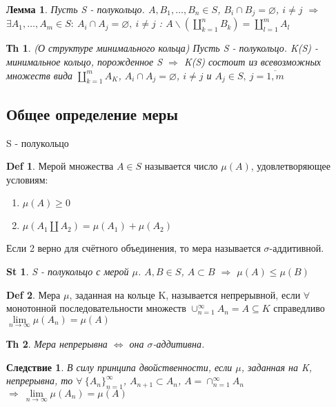 \documentclass[14pt]{article}
\theoremstyle{plain}
\newtheorem{Thm}{Тh}
\newtheorem{Lem}{Лемма}
\newtheorem{St}{St}
\newtheorem{Sled}{Следствие}
\theoremstyle{definition}
\newtheorem{Def}{Def}
\begin{document}
			\begin{Lem}
				Пусть S - полукольцо. $A, B_1, \dots, B_n \in S $, $B_i \cap B_j = \varnothing$, $i \neq j$ $\Rightarrow$ $\exists A_1, \dots, A_m \in S: \ A_i \cap A_j = \varnothing, \ i \neq j$ : $A \backslash \left( \coprod\limits_{k=1}^{n} B_k \right) = \coprod\limits_{l=1}^{m} A_l$
			\end{Lem}
			\begin{Thm}
				(О структуре минимального кольца)\newline 
				Пусть S - полукольцо. K(S) - минимальное кольцо, порожденное S $\Rightarrow$ K(S) состоит из всевозможных множеств вида $\coprod\limits_{k=1}^{m} A_K$, $A_i \cap A_j = \varnothing$, $i \neq j$ и $A_j \in S, \ j = \overline{1, m}$
			\end{Thm}
		\subsection{Общее определение меры}
		 S - полукольцо
		 \begin{Def}
			Мерой множества $A \in S$ называется число $\mu(A)$, удовлетворяющее условиям:
			\begin{enumerate}
				\item $\mu(A) \geq 0$
				\item $\mu\left( A_1 \coprod A_2 \right) = \mu(A_1) + \mu(A_2)$
			\end{enumerate}
			Если 2 верно для счётного объединения, то мера называется $\sigma$-аддитивной. 
		 \end{Def}
		 \begin{St}
			S - полукольцо с мерой $\mu$. $A, B \in S$, $A \subset B$ $\Rightarrow$ $\mu(A) \leq \mu(B)$
		 \end{St}
		 \begin{Def}
			 Мера $\mu$, заданная на кольце K, называется непрерывной, если $\forall$ монотонной последовательности множеств $\cup_{n=1}^{\infty} A_n = A \subseteq K$ справедливо $\lim\limits_{n\to \infty} \mu(A_n) = \mu(A)$
	     \end{Def}
		 \begin{Thm}
			Мера непрерывна $\Leftrightarrow$ она $\sigma$-аддитивна.
		\end{Thm}
		\begin{Sled}
			В силу принципа двойственности, если $\mu$, заданная на K, непрерывна, то $\forall \ \{A_n  \}_{n =1}^{\infty}$, $A_{n+1} \subset A_n$, $ A = \cap_{n=1}^{\infty} A_n$ $\Rightarrow \ \lim\limits_{n\to \infty} \mu(A_n) = \mu(A)$
		\end{Sled}
\end{document}
